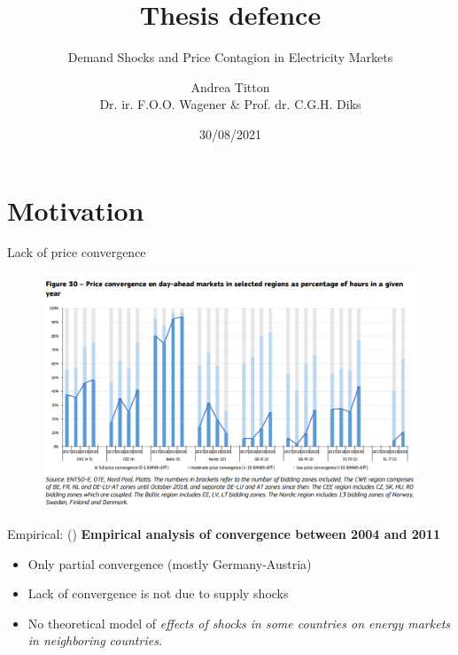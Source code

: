 \documentclass{beamer}
\author[Andrea Titton]{Andrea Titton\\[1ex]  {\small Dr. ir. F.O.O. Wagener \& Prof. dr. C.G.H. Diks}}
\title{Thesis defence}
\subtitle{Demand Shocks and Price Contagion in Electricity Markets}
\institute{Tinbergen Institute}
\date{30/08/2021}
\begin{document}

\frame{\titlepage}

\begin{frame}
    \tableofcontents
\end{frame}

\section{Motivation}

\begin{frame}{Lack of price convergence}
    \begin{figure}
        \includegraphics[height = 0.7\textheight]{figures/convergence.PNG}
        \caption{\cite{Report2019}}
    \end{figure}
\end{frame}

\begin{frame}{Empirical: \citeauthor{Bockers2014} (\citeyear{Bockers2014})}
    \textbf{Empirical analysis of convergence between 2004 and 2011}

    \begin{itemize} \setlength\itemsep{1.5em}
              \pause \item Only partial convergence (mostly Germany-Austria)
              \pause \item Lack of convergence is not due to supply shocks
              \pause \item No theoretical model of \textit{effects of shocks in some countries on energy markets in neighboring countries.}
    \end{itemize}

\end{frame}
\end{document}
